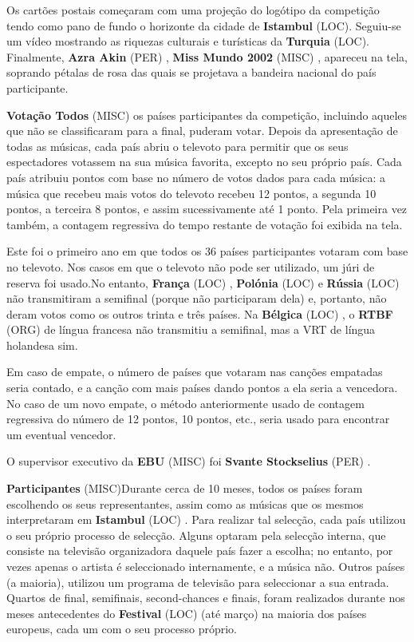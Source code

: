 \documentclass[12pt,a4paper]{article}
\begin{document}
Os cartões postais começaram com uma projeção do logótipo da competição tendo como pano de fundo o horizonte da cidade de \textbf{Istambul} (LOC). Seguiu-se um vídeo mostrando as riquezas culturais e turísticas da \textbf{Turquia} (LOC). Finalmente, \textbf{Azra Akin} (PER) , \textbf{Miss Mundo 2002} (MISC) , apareceu na tela, soprando pétalas de rosa das quais se projetava a bandeira nacional do país participante.



\textbf{Votação Todos} (MISC) os países participantes da competição, incluindo aqueles que não se classificaram para a final, puderam votar. Depois da apresentação de todas as músicas, cada país abriu o televoto para permitir que os seus espectadores votassem na sua música favorita, excepto no seu próprio país. Cada país atribuiu pontos com base no número de votos dados para cada música: a música que recebeu mais votos do televoto recebeu 12 pontos, a segunda 10 pontos, a terceira 8 pontos, e assim sucessivamente até 1 ponto. Pela primeira vez também, a contagem regressiva do tempo restante de votação foi exibida na tela.

Este foi o primeiro ano em que todos os 36 países participantes votaram com base no televoto. Nos casos em que o televoto não pode ser utilizado, um júri de reserva foi usado.No entanto, \textbf{França} (LOC) , \textbf{Polónia} (LOC) e \textbf{Rússia} (LOC) não transmitiram a semifinal (porque não participaram dela) e, portanto, não deram votos como os outros trinta e três países. Na \textbf{Bélgica} (LOC) , o \textbf{RTBF} (ORG) de língua francesa não transmitiu a semifinal, mas a VRT de língua holandesa sim.

Em caso de empate, o número de países que votaram nas canções empatadas seria contado, e a canção com mais países dando pontos a ela seria a vencedora. No caso de um novo empate, o método anteriormente usado de contagem regressiva do número de 12 pontos, 10 pontos, etc., seria usado para encontrar um eventual vencedor.

O supervisor executivo da \textbf{EBU} (MISC) foi \textbf{Svante Stockselius} (PER) .



\textbf{Participantes} (MISC)Durante cerca de 10 meses, todos os países foram escolhendo os seus representantes, assim como as músicas que os mesmos interpretaram em \textbf{Istambul} (LOC) . Para realizar tal selecção, cada país utilizou o seu próprio processo de selecção. Alguns optaram pela selecção interna, que consiste na televisão organizadora daquele país fazer a escolha; no entanto, por vezes apenas o artista é seleccionado internamente, e a música não. Outros países (a maioria), utilizou um programa de televisão para seleccionar a sua entrada. Quartos de final, semifinais, second-chances e finais, foram realizados durante nos meses antecedentes do \textbf{Festival} (LOC) (até março) na maioria dos países europeus, cada um com o seu processo próprio.
\end{document}
